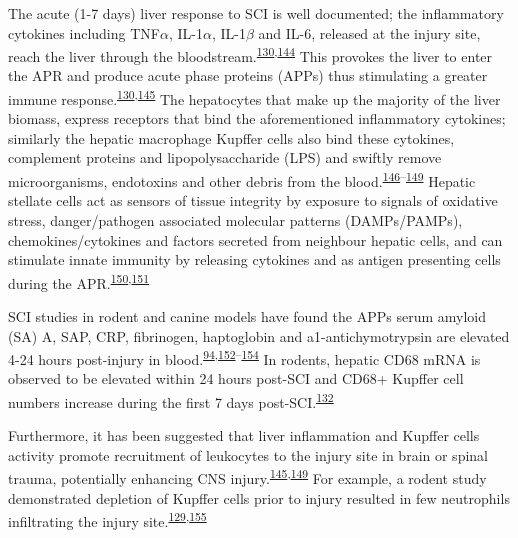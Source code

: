 \documentclass[
]{article}
\begin{document}
The acute (1-7 days) liver response to SCI is well documented; the inflammatory cytokines including TNF\(\alpha\), IL-1\(\alpha\), IL-1\(\beta\) and IL-6, released at the injury site, reach the liver through the bloodstream.\textsuperscript{\protect\hyperlink{ref-fleming_remote_2012}{130},\protect\hyperlink{ref-hundt_assessment_2011}{144}}
This provokes the liver to enter the APR and produce acute phase proteins (APPs) thus stimulating a greater immune response.\textsuperscript{\protect\hyperlink{ref-fleming_remote_2012}{130},\protect\hyperlink{ref-anthony_systemic_2014}{145}}
The hepatocytes that make up the majority of the liver biomass, express receptors that bind the aforementioned inflammatory cytokines; similarly the hepatic macrophage Kupffer cells also bind these cytokines, complement proteins and lipopolysaccharide (LPS) and swiftly remove microorganisms, endotoxins and other debris from the blood.\textsuperscript{\protect\hyperlink{ref-yang_clec4f_2013}{146}--\protect\hyperlink{ref-campbell_central_2005}{149}}
Hepatic stellate cells act as sensors of tissue integrity by exposure to signals of oxidative stress,   danger/pathogen associated molecular patterns (DAMPs/PAMPs), chemokines/cytokines and factors secreted from neighbour hepatic cells, and can stimulate innate immunity by releasing cytokines and as antigen presenting cells during the APR.\textsuperscript{\protect\hyperlink{ref-weiskirchen_cellular_2014}{150},\protect\hyperlink{ref-fujita_roles_2016}{151}}

SCI studies in rodent and canine models have found the APPs serum amyloid (SA) A, SAP, CRP, fibrinogen, haptoglobin and a1-antichymotrypsin are elevated 4-24 hours post-injury in blood.\textsuperscript{\protect\hyperlink{ref-epstein_acute-phase_1999}{94},\protect\hyperlink{ref-pepys_acute_1983}{152}--\protect\hyperlink{ref-steel_major_1994}{154}}
In rodents, hepatic CD68 mRNA is observed to be elevated within 24 hours post-SCI and CD68+ Kupffer cell numbers increase during the first 7 days post-SCI.\textsuperscript{\protect\hyperlink{ref-sauerbeck_spinal_2014}{132}}

Furthermore, it has been suggested that liver inflammation and Kupffer cells activity promote recruitment of leukocytes to the injury site in brain or spinal trauma, potentially enhancing CNS injury.\textsuperscript{\protect\hyperlink{ref-anthony_systemic_2014}{145},\protect\hyperlink{ref-campbell_central_2005}{149}}
For example, a rodent study demonstrated depletion of Kupffer cells prior to injury resulted in few neutrophils infiltrating the injury site.\textsuperscript{\protect\hyperlink{ref-campbell_liver_2008}{129},\protect\hyperlink{ref-campbell_hepatic_2008}{155}}
\end{document}
